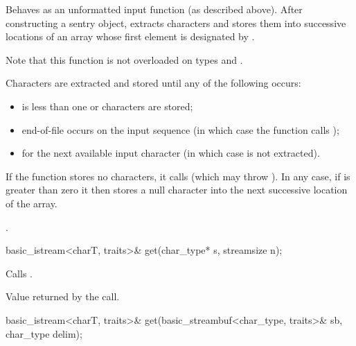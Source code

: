 \begin{itemdescr}
\pnum
\effects
Behaves as an unformatted input function
(as described above).
After constructing a sentry object, extracts
characters and stores them
into successive locations of an array whose first element is designated by
.
\begin{footnote}
Note that this function is not overloaded on types
and
.
\end{footnote}
Characters are extracted and stored until any of the following occurs:
\begin{itemize}
\item
{} is less than one or 
characters are stored;
\item
end-of-file occurs on the input sequence
(in which case the function calls
);
\item
{}
for the next available input
character 
(in which case  is not extracted).
\end{itemize}

\pnum
If the function stores no characters, it calls
(which may throw
).
In any case, if  is greater than zero it then stores a null character
into the next successive location of the array.

\pnum
\returns
{}.
\end{itemdescr}

%
\begin{itemdecl}
basic_istream<charT, traits>& get(char_type* s, streamsize n);
\end{itemdecl}

\begin{itemdescr}
\pnum
\effects
Calls
.

\pnum
\returns
Value returned by the call.
\end{itemdescr}

%
\begin{itemdecl}
basic_istream<charT, traits>& get(basic_streambuf<char_type, traits>& sb, char_type delim);
\end{itemdecl}

